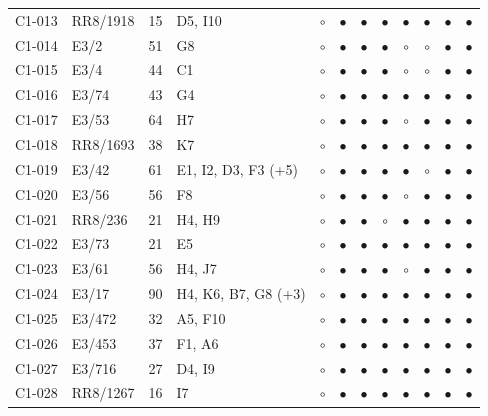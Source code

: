 {\begin{longtable}{llrp{3.9cm}cccccccc}
    C1-013 & RR8/1918 & 15 & D5, I10 & $\circ$ & $\bullet$ & $\bullet$ & $\bullet$ & $\bullet$ & $\bullet$ & $\bullet$ & $\bullet$ \\
    C1-014 & E3/2 & 51 & G8 & $\circ$ & $\bullet$ & $\bullet$ & $\bullet$ & $\circ$ & $\circ$ & $\bullet$ & $\bullet$ \\
    C1-015 & E3/4 & 44 & C1 & $\circ$ & $\bullet$ & $\bullet$ & $\bullet$ & $\circ$ & $\circ$ & $\bullet$ & $\bullet$ \\
    C1-016 & E3/74 & 43 & G4 & $\circ$ & $\bullet$ & $\bullet$ & $\bullet$ & $\bullet$ & $\bullet$ & $\bullet$ & $\bullet$ \\
    C1-017 & E3/53 & 64 & H7 & $\circ$ & $\bullet$ & $\bullet$ & $\bullet$ & $\circ$ & $\bullet$ & $\bullet$ & $\bullet$ \\
    C1-018 & RR8/1693 & 38 & K7 & $\circ$ & $\bullet$ & $\bullet$ & $\bullet$ & $\bullet$ & $\bullet$ & $\bullet$ & $\bullet$ \\
    C1-019 & E3/42 & 61 & E1, I2, D3, F3 (+5) & $\circ$ & $\bullet$ & $\bullet$ & $\bullet$ & $\bullet$ & $\circ$ & $\bullet$ & $\bullet$ \\
    C1-020 & E3/56 & 56 & F8 & $\circ$ & $\bullet$ & $\bullet$ & $\bullet$ & $\circ$ & $\bullet$ & $\bullet$ & $\bullet$ \\
    C1-021 & RR8/236 & 21 & H4, H9 & $\circ$ & $\bullet$ & $\bullet$ & $\circ$ & $\bullet$ & $\bullet$ & $\bullet$ & $\bullet$ \\
    C1-022 & E3/73 & 21 & E5 & $\circ$ & $\bullet$ & $\bullet$ & $\bullet$ & $\bullet$ & $\bullet$ & $\bullet$ & $\bullet$ \\
    C1-023 & E3/61 & 56 & H4, J7 & $\circ$ & $\bullet$ & $\bullet$ & $\bullet$ & $\circ$ & $\bullet$ & $\bullet$ & $\bullet$ \\
    C1-024 & E3/17 & 90 & H4, K6, B7, G8 (+3) & $\circ$ & $\bullet$ & $\bullet$ & $\bullet$ & $\bullet$ & $\bullet$ & $\bullet$ & $\bullet$ \\
    C1-025 & E3/472 & 32 & A5, F10 & $\circ$ & $\bullet$ & $\bullet$ & $\bullet$ & $\bullet$ & $\bullet$ & $\bullet$ & $\bullet$ \\
    C1-026 & E3/453 & 37 & F1, A6 & $\circ$ & $\bullet$ & $\bullet$ & $\bullet$ & $\bullet$ & $\bullet$ & $\bullet$ & $\bullet$ \\
    C1-027 & E3/716 & 27 & D4, I9 & $\circ$ & $\bullet$ & $\bullet$ & $\bullet$ & $\bullet$ & $\bullet$ & $\bullet$ & $\bullet$ \\
    C1-028 & RR8/1267 & 16 & I7 & $\circ$ & $\bullet$ & $\bullet$ & $\bullet$ & $\bullet$ & $\bullet$ & $\bullet$ & $\bullet$ \\

\end{longtable}}
